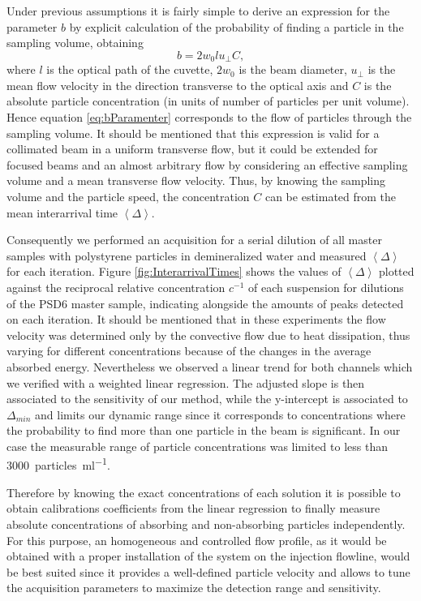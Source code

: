 \documentclass[9pt,twocolumn,twoside]{osajnl}
\begin{document}
Under previous assumptions it is fairly simple to derive an expression for the parameter $b$ by explicit calculation of the probability of finding a particle in the sampling volume, obtaining
\begin{equation}
	b = 2 w_0 l u_\perp C,
\label{eq:bParamenter}
\end{equation}
where $l$ is the optical path of the cuvette, $2 w_0$ is the beam diameter, $u_\perp$ is the mean flow velocity in the direction transverse to the optical axis and $C$ is the absolute particle concentration (in units of number of particles per unit volume). Hence equation \ref{eq:bParamenter} corresponds to the flow of particles through the sampling volume. It should be mentioned that this expression is valid for a collimated beam in a uniform transverse flow, but it could be extended for focused beams and an almost arbitrary flow by considering an effective sampling volume and a mean transverse flow velocity. Thus, by knowing the sampling volume and the particle speed, the concentration $C$ can be estimated from the mean interarrival time $\left\langle \Delta \right\rangle$.

Consequently we performed an acquisition for a serial dilution of all master samples with polystyrene particles in demineralized water and measured $\left\langle \Delta \right\rangle$ for each iteration. Figure \ref{fig:InterarrivalTimes} shows the values of $\left\langle \Delta \right\rangle$ plotted against the reciprocal relative concentration $c^{-1}$ of each suspension for dilutions of the PSD6 master sample, indicating alongside the amounts of peaks detected on each iteration. It should be mentioned that in these experiments the flow velocity was determined only by the convective flow due to heat dissipation, thus varying for different concentrations because of the changes in the average absorbed energy. Nevertheless we observed a linear trend for both channels which we verified with a weighted linear regression. The adjusted slope is then associated to the sensitivity of our method, while the y-intercept is associated to $\Delta_{min}$ and limits our dynamic range since it corresponds to concentrations where the probability to find more than one particle in the beam is significant. In our case the measurable range of particle concentrations was limited to less than \SI{3000}{particles\per\milli\litre}.

Therefore by knowing the exact concentrations of each solution it is possible to obtain calibrations coefficients from the linear regression to finally measure absolute concentrations of absorbing and non-absorbing particles independently. For this purpose, an homogeneous and controlled flow profile, as it would be obtained with a proper installation of the system on the injection flowline, would be best suited since it provides a well-defined particle velocity and allows to tune the acquisition parameters to maximize the detection range and sensitivity.
\end{document}

